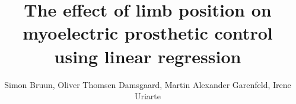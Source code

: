 



%

\title{\LARGE \bf
	The effect of limb position on myoelectric prosthetic control using linear regression
}%


\author{Simon Bruun, Oliver Thomsen Damsgaard, Martin Alexander Garenfeld, Irene Uriarte}%

%

\setcounter{topnumber}{6}
\setcounter{bottomnumber}{6}
\setcounter{totalnumber}{10}
\renewcommand{\topfraction}{1}
\renewcommand{\bottomfraction}{1}
\renewcommand{\textfraction}{0}
\renewcommand{\floatpagefraction}{1}
		
